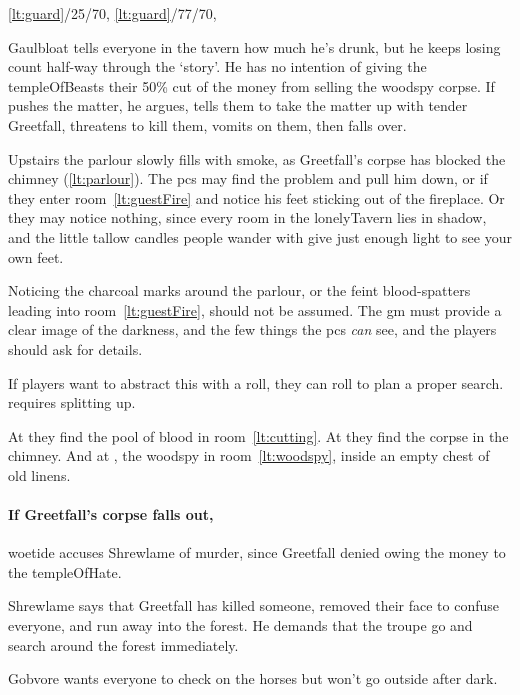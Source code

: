 \documentclass[10pt,twoside]{book}
\begin{document}
%
  {%
    \ref{lt:guard}/25/70,
    \ref{lt:guard}/77/70,
  }%
  {}

Gaulbloat tells everyone in the tavern how much he's drunk, but he keeps losing count half-way through the `story'.
He has no intention of giving the \gls{templeOfBeasts} their 50\% cut of the money from selling the \gls{woodspy} corpse.
If  pushes the matter, he argues, tells them to take the matter up with \gls{tender} Greetfall, threatens to kill them, vomits on them, then falls over.

Upstairs the parlour slowly fills with smoke, as Greetfall's corpse has blocked the chimney (\vref{lt:parlour}).
The \glspl{pc} may find the problem and pull him down, or if they enter room~\vref{lt:guestFire} and notice his feet sticking out of the fireplace.
Or they may notice nothing, since every room in the \gls{lonelyTavern} lies in shadow, and the little tallow candles people wander with give just enough light to see your own feet.

Noticing the charcoal marks around the parlour, or the feint blood-spatters leading into room~\vref{lt:guestFire}, should not be assumed.
The \gls{gm} must provide a clear image of the darkness, and the few things the \glspl{pc} \emph{can} see, and the players should ask for details.

If players want to abstract this with a roll, they can roll  to plan a proper search.
 requires splitting up.

\woetide

At \tn[6] they find the pool of blood in room~\vref{lt:cutting}.
At \tn[10] they find the corpse in the chimney.
And at \tn[12], the \gls{woodspy} in room~\vref{lt:woodspy}, inside an empty chest of old linens.

\paragraph{If Greetfall's corpse falls out,}
\Gls{woetide} accuses Shrewlame of murder, since Greetfall denied owing the money to the \gls{templeOfHate}.

Shrewlame says that Greetfall has killed someone, removed their face to confuse everyone, and run away into the forest.
He demands that the troupe go and search around the forest immediately.

Gobvore wants everyone to check on the horses but won't go outside after dark.
\end{document}
